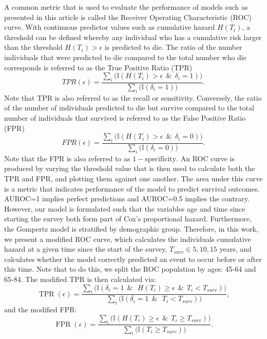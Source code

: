 \documentclass[
]{article}
\begin{document}
A common metric that is used to evaluate the performance of models such as presented in this article is called the Receiver Operating Characteristic (ROC) curve. With continuous predictor values such as cumulative hazard \(H(T_i)\), a threshold can be defined whereby any individual who has a cumulative risk larger than the threshold \(H(T_i)>\epsilon\) is predicted to die. The ratio of the number individuals that were predicted to die compared to the total number who die corresponds is referred to as the True Positive Ratio (TPR)
\begin{equation}
  TPR(\epsilon)=\frac{\sum_i\big(\mathbb{I}(H(T_i)>\epsilon \ \ \& \ \ \delta_i=1)\big)}{\sum_i\big(\mathbb{I}(\delta_i=1)\big)}.
\end{equation}
Note that TPR is also referred to as the recall or sensitivity. Conversely, the ratio of the number of individuals predicted to die but survive compared to the total number of individuals that survived is referred to as the False Positive Ratio (FPR)
\begin{equation}
  FPR(\epsilon)=\frac{\sum_i\big(\mathbb{I}(H(T_i)>\epsilon \ \ \& \ \ \delta_i=0)\big)}{\sum_i\big(\mathbb{I}(\delta_i=0)\big)}.
\end{equation}
Note that the FPR is also referred to as \(1-\mathrm{specificity}\). An ROC curve is produced by varying the threshold value that is then used to calculate both the TPR and FPR, and plotting them against one another.
The area under this curve is a metric that indicates performance of the model to predict survival outcomes. AUROC=1 implies perfect predictions and AUROC=0.5 implies the contrary. However, our model is formulated such that the variables age and time since starting the survey both form part of Cox's proportional hazard. Furthermore, the Gompertz model is stratified by demographic group. Therefore, in this work, we present a modified ROC curve, which calculates the individuals cumulative hazard at a given time since the start of the survey, \(T_{surv} \in {5, 10, 15}\) years, and calculates whether the model correctly predicted an event to occur before or after this time.
Note that to do this, we split the ROC population by ages: 45-64 and 65-84. The modified TPR is then calculated via:
\begin{equation}
  \operatorname{TPR}(\epsilon)=\frac{\sum_i\big(\mathbb{I}(\delta_i=1 \ \ \& \ \ \ H(T_i)\geq \epsilon \ \ \& \ \ T_i<T_{surv})\big)}{\sum_i\big(\mathbb{I}(\delta_i=1 \ \ \& \ \ \ T_i<T_{surv})\big)},
\end{equation}
and the modified FPR:
\begin{equation}
  \operatorname{FPR}(\epsilon)=\frac{\sum_i\big(\mathbb{I}(H(T_i)\geq \epsilon \ \ \& \ \ T_i\geq T_{surv})\big)}{\sum_i\big(\mathbb{I}(T_i\geq T_{surv})\big)}.
\end{equation}
\end{document}
